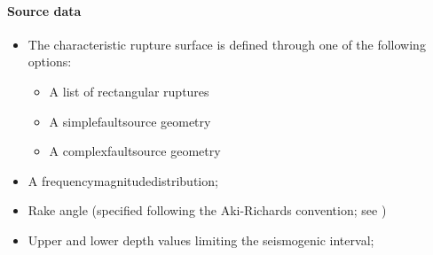 %
\paragraph{Source data}
%
\begin{itemize}
\item The characteristic rupture surface is defined through one of the 
	following options:
	\begin{itemize}
		\item A list of rectangular ruptures 
		\item A \gls{simplefaultsource} geometry
		\item A \gls{complexfaultsource} geometry
	\end{itemize}
\item A \gls{frequencymagnitudedistribution};
\item Rake angle (specified following the Aki-Richards convention; 
see \citet{aki2002}) 
\item Upper and lower depth values limiting the seismogenic interval; 
\end{itemize}